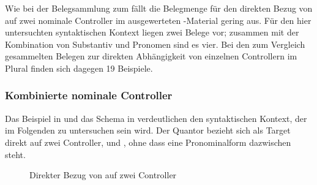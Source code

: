Wie bei der Belegsammlung zum \CAO{} fällt die Belegmenge für den direkten
Bezug von   auf zwei nominale Controller im
ausgewerteten \KC{}-Material gering aus. Für den hier untersuchten
syntaktischen Kontext liegen zwei Belege vor; zusammen mit der Kombination von
Substantiv und Pronomen sind es vier. Bei den zum Vergleich gesammelten Belegen
zur direkten Abhängigkeit von einzelnen Controllern im Plural finden sich
dagegen 19 Beispiele.

\subsubsection{Kombinierte nominale Controller}
\label{subsubsec:conomctrlpers}

Das Beispiel in  und das Schema in 
verdeutlichen den syntaktischen Kontext, der im Folgenden zu untersuchen sein
wird. Der Quantor  bezieht sich als Target direkt auf zwei
Controller,  und , ohne dass eine Pronominalform
dazwischen steht.

\begin{exe}
\end{exe}

\begin{figure}
\caption{Direkter Bezug von  auf zwei Controller}
\label{fig:beid2subst}
\end{figure}

